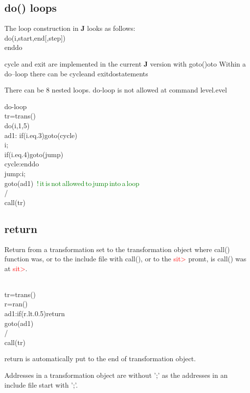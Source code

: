 \subsection{\textcolor{VioletRed}{do}() loops}
\label{loops}
The loop construction in \textbf{J} looks as follows:
\\
\textcolor{VioletRed}{do}(i,start,end[,step])
\\
enddo
\\
\begin{note}
cycle and exit are implemented in the current \textbf{J} version with \textcolor{VioletRed}{goto}()oto
Within a do–loop there can be cycleand exitdostatements
\end{note}
\begin{note}
There can be 8 nested loops. do-loop is not allowed at command level.evel
\end{note}
\begin{example}[doex]do-loop\\
\label{doex}
tr=\textcolor{VioletRed}{trans}()\\
\textcolor{VioletRed}{do}(i,1,5)\\
ad1: \textcolor{VioletRed}{if}(i.eq.3)\textcolor{VioletRed}{goto}(cycle)\\
i;\\
\textcolor{VioletRed}{if}(i.eq.4)\textcolor{VioletRed}{goto}(jump)\\
cycle:enddo\\
jump:i;\\
\textcolor{VioletRed}{goto}(ad1) \,\textcolor{green}{!\,it\,is\,not\,allowed\,to\,jump\,into\,a\,loop}\\
/\\
\textcolor{VioletRed}{call}(tr)
\end{example}
\subsection{return}
\label{return}
Return from a transformation set to the transformation object where \textcolor{VioletRed}{call}()
function was, or  to the include file with \textcolor{VioletRed}{call}(), or to the \textcolor{Red}{sit>} promt,
is \textcolor{VioletRed}{call}() was at \textcolor{Red}{sit>}.
\begin{example}[retex]\\
\label{retex}
tr=\textcolor{VioletRed}{trans}()\\
r=\textcolor{VioletRed}{ran}()\\
ad1:\textcolor{VioletRed}{if}(r.lt.0.5)return\\
\textcolor{VioletRed}{goto}(ad1)\\
/\\
\textcolor{VioletRed}{call}(tr)
\end{example}
\begin{note}
return is automatically put to the end of transformation object.
\end{note}
\begin{note}
Addresses in a transformation object are without ';' as the addresses in an include file start with ';'.
\end{note}
